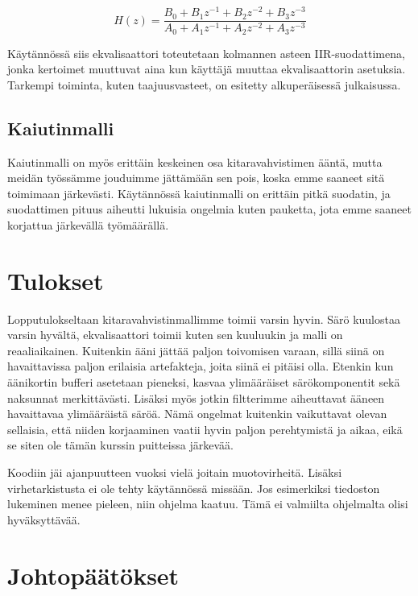 \documentclass[11pt, a4paper, oneside]{article}
\begin{document}
\begin{equation}
H(z)=\frac{B_0 + B_1 z^{-1} + B_2 z^{-2} + B_3 z^{-3} }{A_0 + A_1 z^{-1}  + A_2 z^{-2}  + A_3 z^{-3} }
\label{eq:eq} %
\end{equation} 

Käytännössä siis ekvalisaattori toteutetaan kolmannen asteen IIR-suodattimena, jonka kertoimet muuttuvat aina kun käyttäjä muuttaa ekvalisaattorin asetuksia. 
Tarkempi toiminta, kuten taajuusvasteet, on esitetty alkuperäisessä julkaisussa. \cite{fender}

 \subsection{Kaiutinmalli}
 
 Kaiutinmalli on myös erittäin keskeinen osa kitaravahvistimen ääntä, mutta meidän työssämme jouduimme jättämään sen pois, koska emme saaneet sitä toimimaan järkevästi. 
 Käytännössä kaiutinmalli on erittäin pitkä suodatin, ja suodattimen pituus aiheutti lukuisia ongelmia kuten pauketta, jota emme saaneet korjattua järkevällä työmäärällä.
 
\section{Tulokset}

Lopputulokseltaan kitaravahvistinmallimme toimii varsin hyvin. Särö kuulostaa varsin hyvältä, ekvalisaattori toimii kuten sen kuuluukin ja malli on reaaliaikainen. 
Kuitenkin ääni jättää paljon toivomisen varaan, sillä siinä on havaittavissa paljon erilaisia artefakteja, joita siinä ei pitäisi olla. 
Etenkin kun äänikortin bufferi asetetaan pieneksi, kasvaa ylimääräiset särökomponentit sekä naksunnat merkittävästi. 
Lisäksi myös jotkin filtterimme aiheuttavat ääneen havaittavaa ylimääräistä säröä.
Nämä ongelmat kuitenkin vaikuttavat olevan sellaisia, että niiden korjaaminen vaatii hyvin paljon perehtymistä ja aikaa, eikä se siten ole tämän kurssin puitteissa järkevää.

Koodiin jäi ajanpuutteen vuoksi vielä joitain muotovirheitä. Lisäksi virhetarkistusta ei ole tehty käytännössä missään. Jos esimerkiksi tiedoston lukeminen menee pieleen, niin ohjelma kaatuu. Tämä ei valmiilta ohjelmalta olisi hyväksyttävää.


\section{Johtopäätökset}
\end{document}
